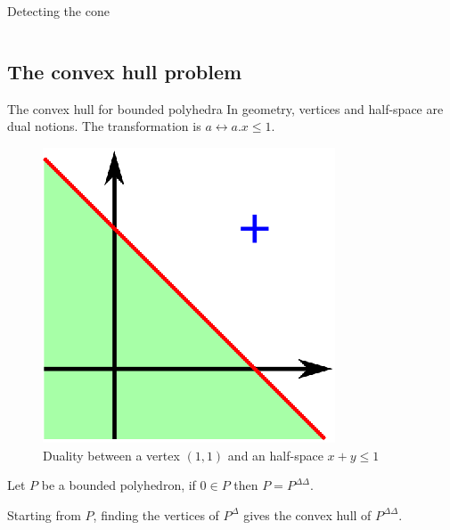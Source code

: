 \begin{frame}{Detecting the cone}
\begin{columns}[c]
\begin{column}{5cm}
\end{column}
\end{columns}

\end{frame}

\subsection{The convex hull problem}
\begin{frame}{The convex hull for bounded polyhedra}
In geometry, vertices and half-space are dual notions. The transformation is $a \leftrightarrow a.x \leq 1 $.
\begin{figure}
\includegraphics[scale=0.7]{images/dual.eps}
\caption{Duality between a vertex $(1,1)$ and an half-space $x+y \leq 1$}
\end{figure}

\vspace*{-0.5cm}

\begin{theorem}
Let $P$ be a bounded polyhedron, if $0\in P$ then $P=P^{\Delta\Delta}$.
\end{theorem}

Starting from $P$, finding the vertices of $P^\Delta$ gives the convex hull of $P^{\Delta\Delta}$.
\end{frame}

